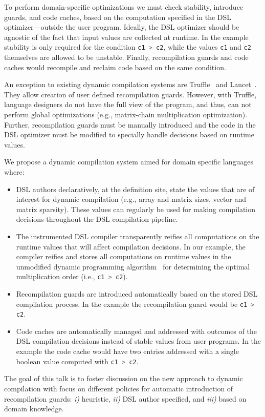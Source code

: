 \documentclass{llncs}
\newcommand{\scode}[1]{\lstinline[language=Scala,columns=fixed,basicstyle=\ttfamily,keywordstyle=\ttfamily]|#1|}
\newcommand{\code}[1]{\scode{#1}}
\begin{document}
 To perform domain-specific optimizations we must check stability, introduce guards, and code caches, based on the
  computation specified in the DSL optimizer---outside the user program. Ideally, the DSL optimizer should be
  agnostic of the fact that input values are collected at runtime. In the example
  stability is only required for the condition \code{c1 > c2}, while the values
  \code{c1} and \code{c2} themselves are allowed to be unstable. Finally, recompilation guards
  and code caches would recompile and reclaim code based on the same condition.

An exception to existing dynamic compilation systems are Truffle~\cite{wurthinger2013one} and Lancet~\cite{lancet}. They allow creation of user defined recompilation guards. However, with Truffle, language designers do not have the full view of the program, and thus, can not perform global optimizations (e.g., matrix-chain multiplication optimization). Further, recompilation guards must be manually introduced and the code in the DSL optimizer must be modified to specially handle decisions based on runtime values.

We propose a dynamic compilation system aimed for domain specific languages where:
\begin{itemize}

  \item DSL authors declaratively, at the definition site, state the values that
    are of interest for dynamic compilation (e.g., array and matrix sizes, vector
    and matrix sparsity). These values can regularly be used for making
    compilation decisions throughout the DSL compilation pipeline.

  \item The instrumented DSL compiler transparently reifies all computations on
   the runtime values that will affect compilation decisions. In our example,
   the compiler reifies and stores all computations on runtime values in the
   unmodified dynamic programming algorithm~\cite{cormen2001introduction} for determining the
   optimal multiplication order (i.e., \code{c1 > c2}).

  \item Recompilation guards are introduced automatically based on the stored DSL
   compilation process. In the example the recompilation guard would be \code{c1 > c2}.

  \item Code caches are automatically managed and addressed with outcomes of the
   DSL compilation decisions instead of stable values from user programs. In the example
   the code cache would have two entries addressed with a single boolean
   value computed with \code{c1 > c2}.

\end{itemize}

The goal of this talk is to foster discussion on the new approach to dynamic compilation with focus on different policies for automatic introduction of recompilation guards:
 \emph{i)} heuristic, \emph{ii)} DSL author specified, and \emph{iii)} based on domain knowledge.

{
\linespread{0.90}


}
\end{document}
